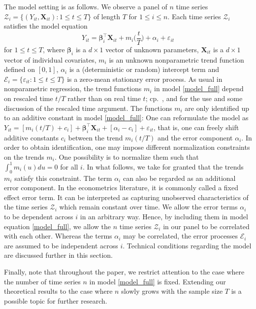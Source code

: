 \documentclass[a4paper,12pt]{article}
\begin{document}
The model setting is as follows. We observe a panel of $n$ time series $\mathcal{Z}_i = \{(Y_{it}, \mathbf{X}_{it}): 1 \le t \le T \}$ of length $T$ for $1 \le i \le n$. Each time series $\mathcal{Z}_i$ satisfies the model equation \begin{equation}\label{model_full}
Y_{it} = \bm{\beta}^\top_i \mathbf{X}_{it} + m_i \Big( \frac{t}{T} \Big) + \alpha_i + \varepsilon_{it} 
\end{equation}
for $1 \le t \le T$, where $\bm{\beta}_i$ is a $d \times 1$ vector of unknown parameters, $\mathbf{X}_{it}$ is a $d\times 1$ vector of individual covariates, $m_i$ is an unknown nonparametric trend function defined on $[0,1]$, $\alpha_i$ is a (deterministic or random) intercept term and $\mathcal{E}_i = \{ \varepsilon_{it}: 1 \le t \le T \}$ is a zero-mean stationary error process. As usual in nonparametric regression, the trend functions $m_i$ in model \eqref{model_full} depend on rescaled time $t/T$ rather than on real time $t$; cp.\ \cite{Robinson1989}, \cite{Dahlhaus1997} and \cite{VogtLinton2014} for the use and some discussion of the rescaled time argument. The functions $m_i$ are only identified up to an additive constant in model \eqref{model_full}: One can reformulate the model as $Y_{it} = [m_i(t/T) + c_i] + \bm{\beta}_i^\top \mathbf{X}_{it} + [\alpha_i - c_i] + \varepsilon_{it}$, that is, one can freely shift additive constants $c_i$ between the trend $m_i(t/T)$ and the error component $\alpha_i$. In order to obtain identification, one may impose different normalization constraints on the trends $m_i$. One possibility is to normalize them such that $\int_0^1 m_i(u) du = 0$ for all $i$. In what follows, we take for granted that the trends $m_i$ satisfy this constraint. The term $\alpha_i$ can also be regarded as an additional error component. In the econometrics literature, it is commonly called a fixed effect error term. It can be interpreted as capturing unobserved characteristics of the time series $\mathcal{Z}_i$ which remain constant over time. We allow the error terms $\alpha_i$ to be dependent across $i$ in an arbitrary way. Hence, by including them in model equation \eqref{model_full}, we allow the $n$ time series $\mathcal{Z}_i$ in our panel to be correlated with each other. Whereas the terms $\alpha_i$ may be correlated, the error processes $\mathcal{E}_i$ are assumed to be independent across $i$. Technical conditions regarding the model are discussed further in this section.

Finally, note that throughout the paper, we restrict attention to the case where the number of time series $n$ in model \eqref{model_full} is fixed. Extending our theoretical results to the case where $n$ slowly grows with the sample size $T$ is a possible topic for further research.
\end{document}
